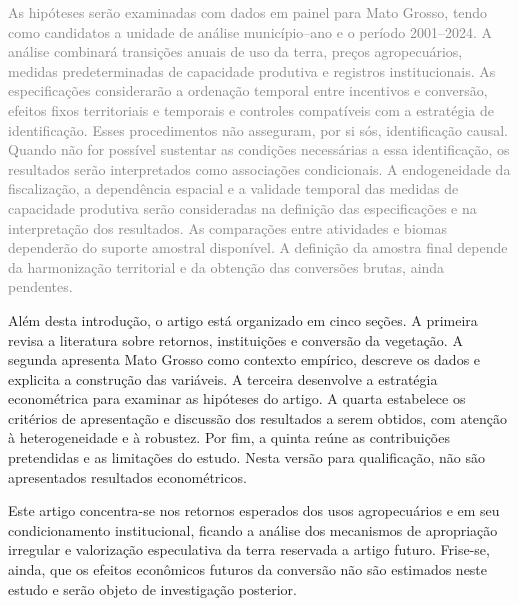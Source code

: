 
\textcolor{gray}{As hipóteses serão examinadas com dados em painel para Mato Grosso, tendo como candidatos a unidade de análise município--ano e o período 2001--2024. A análise combinará transições anuais de uso da terra, preços agropecuários, medidas predeterminadas de capacidade produtiva e registros institucionais. As especificações considerarão a ordenação temporal entre incentivos e conversão, efeitos fixos territoriais e temporais e controles compatíveis com a estratégia de identificação. Esses procedimentos não asseguram, por si sós, identificação causal. Quando não for possível sustentar as condições necessárias a essa identificação, os resultados serão interpretados como associações condicionais. A endogeneidade da fiscalização, a dependência espacial e a validade temporal das medidas de capacidade produtiva serão consideradas na definição das especificações e na interpretação dos resultados. As comparações entre atividades e biomas dependerão do suporte amostral disponível. A definição da amostra final depende da harmonização territorial e da obtenção das conversões brutas, ainda pendentes.}



Além desta introdução, o artigo está organizado em cinco seções. A primeira revisa a literatura sobre retornos, instituições e conversão da vegetação. A segunda apresenta Mato Grosso como contexto empírico, descreve os dados e explicita a construção das variáveis. A terceira desenvolve a estratégia econométrica para examinar as hipóteses do artigo. A quarta estabelece os critérios de apresentação e discussão dos resultados a serem obtidos, com atenção à heterogeneidade e à robustez. Por fim, a quinta reúne as contribuições pretendidas e as limitações do estudo. Nesta versão para qualificação, não são apresentados resultados econométricos.

Este artigo concentra-se nos retornos esperados dos usos agropecuários e em seu condicionamento institucional, ficando a análise dos mecanismos de apropriação irregular e valorização especulativa da terra reservada a artigo futuro. Frise-se, ainda, que os efeitos econômicos futuros da conversão não são estimados neste estudo e serão objeto de investigação posterior.
